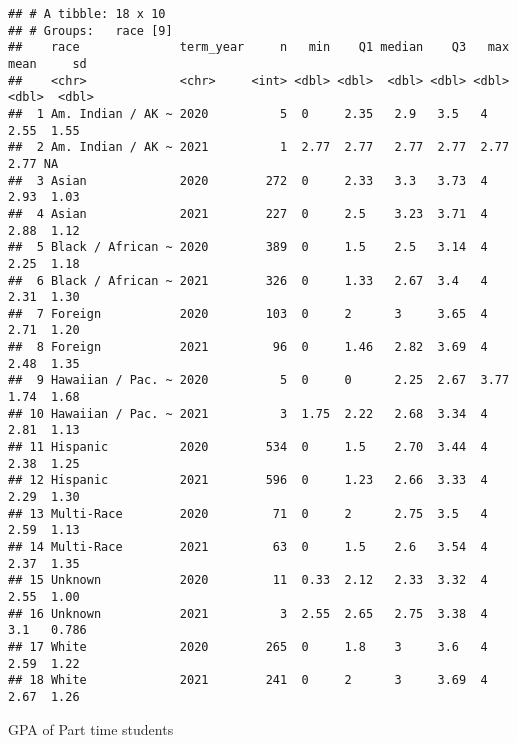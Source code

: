 \documentclass[]{article}
\newenvironment{Shaded}{\begin{snugshade}}{\end{snugshade}}
\newcommand{\DataTypeTok}[1]{\textcolor[rgb]{0.13,0.29,0.53}{#1}}
\newcommand{\FloatTok}[1]{\textcolor[rgb]{0.00,0.00,0.81}{#1}}
\newcommand{\KeywordTok}[1]{\textcolor[rgb]{0.13,0.29,0.53}{\textbf{#1}}}
\newcommand{\NormalTok}[1]{#1}
\newcommand{\OperatorTok}[1]{\textcolor[rgb]{0.81,0.36,0.00}{\textbf{#1}}}
\newcommand{\StringTok}[1]{\textcolor[rgb]{0.31,0.60,0.02}{#1}}
\begin{document}
\begin{verbatim}
## # A tibble: 18 x 10
## # Groups:   race [9]
##    race              term_year     n   min    Q1 median    Q3   max  mean     sd
##    <chr>             <chr>     <int> <dbl> <dbl>  <dbl> <dbl> <dbl> <dbl>  <dbl>
##  1 Am. Indian / AK ~ 2020          5  0     2.35   2.9   3.5   4     2.55  1.55 
##  2 Am. Indian / AK ~ 2021          1  2.77  2.77   2.77  2.77  2.77  2.77 NA    
##  3 Asian             2020        272  0     2.33   3.3   3.73  4     2.93  1.03 
##  4 Asian             2021        227  0     2.5    3.23  3.71  4     2.88  1.12 
##  5 Black / African ~ 2020        389  0     1.5    2.5   3.14  4     2.25  1.18 
##  6 Black / African ~ 2021        326  0     1.33   2.67  3.4   4     2.31  1.30 
##  7 Foreign           2020        103  0     2      3     3.65  4     2.71  1.20 
##  8 Foreign           2021         96  0     1.46   2.82  3.69  4     2.48  1.35 
##  9 Hawaiian / Pac. ~ 2020          5  0     0      2.25  2.67  3.77  1.74  1.68 
## 10 Hawaiian / Pac. ~ 2021          3  1.75  2.22   2.68  3.34  4     2.81  1.13 
## 11 Hispanic          2020        534  0     1.5    2.70  3.44  4     2.38  1.25 
## 12 Hispanic          2021        596  0     1.23   2.66  3.33  4     2.29  1.30 
## 13 Multi-Race        2020         71  0     2      2.75  3.5   4     2.59  1.13 
## 14 Multi-Race        2021         63  0     1.5    2.6   3.54  4     2.37  1.35 
## 15 Unknown           2020         11  0.33  2.12   2.33  3.32  4     2.55  1.00 
## 16 Unknown           2021          3  2.55  2.65   2.75  3.38  4     3.1   0.786
## 17 White             2020        265  0     1.8    3     3.6   4     2.59  1.22 
## 18 White             2021        241  0     2      3     3.69  4     2.67  1.26
\end{verbatim}

GPA of Part time students

\begin{Shaded}
\end{Shaded}
\end{document}
